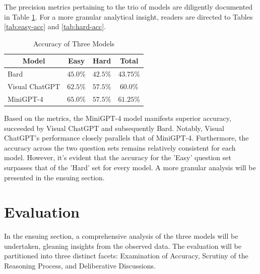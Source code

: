 \documentclass[twocolumn,11pt]{report}
\begin{document}
The precision metrics pertaining to the trio of models are diligently documented in Table \ref{tab:accuracy}. For a more granular analytical insight, readers are directed to Tables \ref{tab:easy-acc} and \ref{tab:hard-acc}.
\begin{table}[h]
    \centering
    \caption{Accuracy of Three Models}
    \label{tab:accuracy}
    \begin{tabular}{@{}lccc@{}}
    \toprule
    \multicolumn{1}{c}{Model} & Easy      & Hard & Total \\ \midrule
    Bard                      &  $45.0\%$ & $42.5\%$ &  $43.75\%$ \\
    Visual ChatGPT            &  $62.5\%$ & $57.5\%$ &  $60.0\%$  \\
    MiniGPT-4                 &  $65.0\%$ & $57.5\%$ &  $61.25\%$  \\ \bottomrule
    \end{tabular}
\end{table}

Based on the metrics, the MiniGPT-4 model manifests superior accuracy, succeeded by Visual ChatGPT and subsequently Bard. Notably, Visual ChatGPT's performance closely parallels that of MiniGPT-4. Furthermore, the accuracy across the two question sets remains relatively consistent for each model. However, it's evident that the accuracy for the 'Easy' question set surpasses that of the 'Hard' set for every model. A more granular analysis will be presented in the ensuing section.

\section{Evaluation}
In the ensuing section, a comprehensive analysis of the three models will be undertaken, gleaning insights from the observed data. The evaluation will be partitioned into three distinct facets: Examination of Accuracy, Scrutiny of the Reasoning Process, and Deliberative Discussions.
\end{document}

